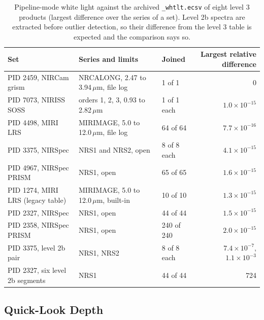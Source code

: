 \documentclass[11pt,a4paper]{article}
\newcommand{\code}[1]{\texttt{\small #1}}
\begin{document}
    \begin{table}[H]
        \centering
        \small
        \begin{tabularx}{\textwidth}{lXlr}
            \toprule
            \textbf{Set} & \textbf{Series and limits} & \textbf{Joined} & \textbf{Largest relative difference} \\
            \midrule
            PID 2459, NIRCam grism & NRCALONG, 2.47 to 3.94\,$\mu$m, file log & 1 of 1 & 0 \\
            PID 7073, NIRISS SOSS & orders 1, 2, 3, 0.93 to 2.82\,$\mu$m & 1 of 1 each & $1.0 \times 10^{-15}$ \\
            PID 4498, MIRI LRS & MIRIMAGE, 5.0 to 12.0\,$\mu$m, file log & 64 of 64 & $7.7 \times 10^{-16}$ \\
            PID 3375, NIRSpec & NRS1 and NRS2, open & 8 of 8 each & $4.1 \times 10^{-15}$ \\
            PID 4967, NIRSpec PRISM & NRS1, open & 65 of 65 & $1.6 \times 10^{-15}$ \\
            PID 1274, MIRI LRS (legacy table) & MIRIMAGE, 5.0 to 12.0\,$\mu$m, built-in & 10 of 10 & $1.3 \times 10^{-15}$ \\
            PID 2327, NIRSpec & NRS1, open & 44 of 44 & $1.5 \times 10^{-15}$ \\
            PID 2358, NIRSpec PRISM & NRS1, open & 240 of 240 & $2.0 \times 10^{-15}$ \\
            \midrule
            PID 3375, level 2b pair & NRS1, NRS2 & 8 of 8 each & $7.4 \times 10^{-7}$, $1.1 \times 10^{-3}$ \\
            PID 2327, six level 2b segments & NRS1 & 44 of 44 & 724 \\
            \bottomrule
        \end{tabularx}
        \caption{Pipeline-mode white light against the archived \code{\_whtlt.ecsv} of eight level 3 products (largest difference over the series of a set). Level 2b spectra are extracted before outlier detection, so their difference from the level 3 table is expected and the comparison says so.}
    \end{table}

    \subsection{Quick-Look Depth}
    \label{sec:quicklook}
\end{document}
